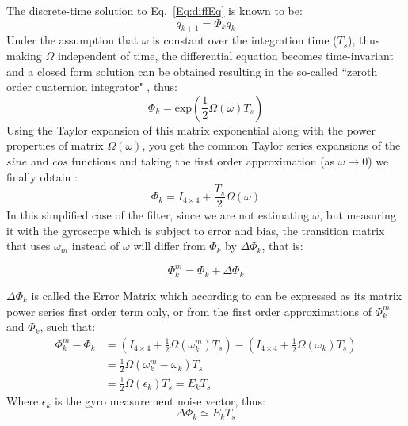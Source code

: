 \documentclass[a4paper,10pt]{article}
\begin{document}
  The discrete-time solution to Eq.~\ref{Eq:diffEq} is known to be: 
 \begin{equation}
  q_{k+1} = \Phi_k q_k
  \label{Eq:transitionEq}
 \end{equation}
 Under the assumption that $\omega$ is constant over the integration time ($T_s$), thus making $\Omega$ independent of time, the differential equation becomes time-invariant and a closed form solution can be obtained resulting in the so-called ``zeroth order quaternion integrator" \cite{Trawny2005}, thus: 
 \begin{equation}
  \Phi_k = \text{exp}\left( \frac{1}{2}\Omega({\omega})T_s \right)
 \end{equation}
  Using the Taylor expansion of this matrix exponential along with the power properties of matrix $\Omega(\omega)$, you get the common Taylor series expansions of the $sine$ and $cos$ functions and taking the first order approximation (as $\omega \rightarrow 0$) we finally obtain \cite{Trawny2005}:
  \begin{equation}
   \Phi_k = I_{4\times4} + \frac{T_s}{2}\Omega({\omega})
  \end{equation}
  In this simplified case of the filter, since we are not estimating $\omega$, but measuring it with the gyroscope which is subject to error and bias, the transition matrix that uses $\omega_m$ instead of $\omega$ will differ from $\Phi_k$ by $\Delta\Phi_k$, that is: 
  
  \begin{equation}
   \Phi^m_k = \Phi_k + \Delta\Phi_k
   \label{Eq:measuredPhi}
  \end{equation}
  
  $\Delta\Phi_k$ is called the Error Matrix which according to \cite{Choukroun2003} can be expressed as its matrix power series first order term only, or from the first order approximations of $\Phi^m_k$ and $\Phi_k$, such that:
  \begin{align}
   \Phi^m_k - \Phi_k &= (I_{4\times4} + \frac{1}{2}\Omega(\omega^m_k)T_s) - (I_{4\times4} + \frac{1}{2}\Omega({\omega_k})T_s) \\
                     &= \frac{1}{2}\Omega(\omega^m_k - \omega_k)T_s \\
                     &= \frac{1}{2}\Omega(\epsilon_k)T_s = E_k T_s
  \end{align}
  Where $\epsilon_k$ is the gyro measurement noise vector, thus: 
  \begin{equation}
   \Delta{\Phi_k} \simeq E_k T_s
  \end{equation}
  
\end{document}

